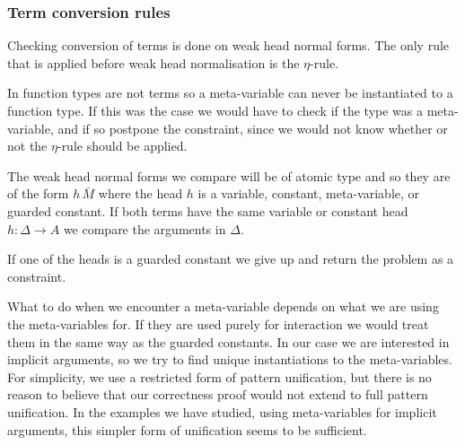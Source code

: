\subsubsection{Term conversion rules}

Checking conversion of terms is done on weak head normal forms. The only rule
that is applied before weak head normalisation is the $\eta$-rule.


In {\Core} function types are not terms so a meta-variable can never be
instantiated to a function type. If this was the case we would have to check if
the type was a meta-variable, and if so postpone the constraint, since we would
not know whether or not the $\eta$-rule should be applied.

The weak head normal forms we compare will be of atomic type and so they are of
the form $h\,\bar M$ where the head $h$ is a variable, constant, meta-variable,
or guarded constant. If both terms have the same variable or constant head $h :
\Delta \to A$ we compare the arguments in $\Delta$.


If one of the heads is a guarded constant we give up and return the problem as
a constraint.


What to do when we encounter a meta-variable depends on what we are using the
meta-variables for. If they are used purely for interaction we would treat them
in the same way as the guarded constants. In our case we are interested in
implicit arguments, so we try to find unique instantiations to the meta-variables. For simplicity, we use a restricted form of pattern
unification, but there is no
reason to believe that our correctness proof would not extend to full pattern
unification. In the examples we have studied, using meta-variables for implicit
arguments, this simpler form of unification seems to be sufficient.

